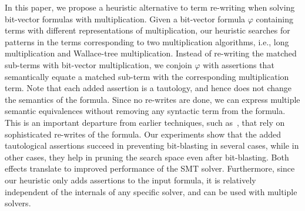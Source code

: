 In this paper, we propose a heuristic alternative to term re-writing
when solving bit-vector formulas with multiplication.  Given a
bit-vector formula $\varphi$ containing terms with different
representations of multiplication, our heuristic searches for patterns
in the terms corresponding to two multiplication algorithms, i.e.,
long multiplication and Wallace-tree multiplication. Instead of
re-writing the matched sub-terms with bit-vector multiplication, we
conjoin $\varphi$ with assertions that semantically equate a matched
sub-term with the corresponding multiplication term.  Note that each
added assertion is a tautology, and hence does not change the
semantics of the formula.  Since no re-writes are done, we can express
multiple semantic equivalences without removing any syntactic term
from the formula.  This is an important departure from earlier
techniques, such as~\cite{kolbl}, that rely on sophisticated re-writes
of the formula. Our experiments show that the added tautological
assertions succeed in preventing bit-blasting in several cases, while
in other cases, they help in pruning the search space even after
bit-blasting.  Both effects translate to improved performance of the
SMT solver.  Furthermore, since our heuristic only adds assertions to
the input formula, it is relatively independent of the internals of
any specific solver, and can be used with multiple solvers. %



%
